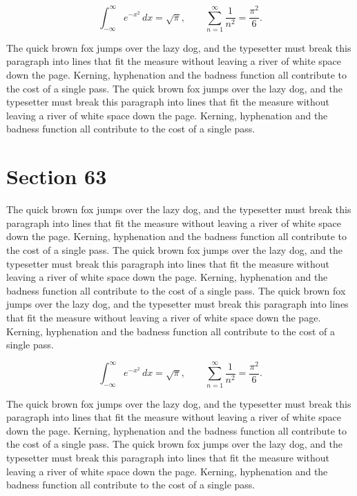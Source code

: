 \documentclass{article}
\begin{document}
\begin{equation}
\int_{-\infty}^{\infty} e^{-x^{2}}\,dx = \sqrt{\pi}, \qquad
\sum_{n=1}^{\infty} \frac{1}{n^{2}} = \frac{\pi^{2}}{6}.
\end{equation}

The quick brown fox jumps over the lazy dog, and the typesetter must break this paragraph into lines that fit the measure without leaving a river of white space down the page. Kerning, hyphenation and the badness function all contribute to the cost of a single pass. The quick brown fox jumps over the lazy dog, and the typesetter must break this paragraph into lines that fit the measure without leaving a river of white space down the page. Kerning, hyphenation and the badness function all contribute to the cost of a single pass. 
\section{Section 63}
The quick brown fox jumps over the lazy dog, and the typesetter must break this paragraph into lines that fit the measure without leaving a river of white space down the page. Kerning, hyphenation and the badness function all contribute to the cost of a single pass. The quick brown fox jumps over the lazy dog, and the typesetter must break this paragraph into lines that fit the measure without leaving a river of white space down the page. Kerning, hyphenation and the badness function all contribute to the cost of a single pass. The quick brown fox jumps over the lazy dog, and the typesetter must break this paragraph into lines that fit the measure without leaving a river of white space down the page. Kerning, hyphenation and the badness function all contribute to the cost of a single pass. 

\begin{equation}
\int_{-\infty}^{\infty} e^{-x^{2}}\,dx = \sqrt{\pi}, \qquad
\sum_{n=1}^{\infty} \frac{1}{n^{2}} = \frac{\pi^{2}}{6}.
\end{equation}

The quick brown fox jumps over the lazy dog, and the typesetter must break this paragraph into lines that fit the measure without leaving a river of white space down the page. Kerning, hyphenation and the badness function all contribute to the cost of a single pass. The quick brown fox jumps over the lazy dog, and the typesetter must break this paragraph into lines that fit the measure without leaving a river of white space down the page. Kerning, hyphenation and the badness function all contribute to the cost of a single pass. 
\end{document}

